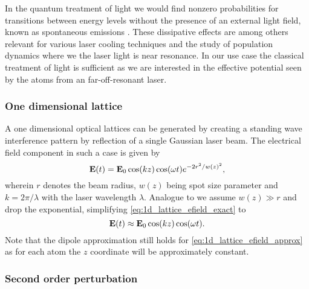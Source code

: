 In the quantum treatment of light we would find nonzero probabilities for
transitions between energy levels without the presence of an external light
field, known as spontaneous emissions \cite{Gerry2004}. These dissipative
effects are among others relevant for various laser cooling techniques and
the study of population dynamics where we the laser light is near resonance.
In our use case the classical treatment of light is sufficient as we are
interested in the effective potential seen by the atoms from an
far-off-resonant laser.

\subsubsection{One dimensional lattice}

A one dimensional optical lattices can be generated by creating a standing
wave interference pattern by reflection of a single Gaussian laser beam. The
electrical field component in such a case is given by
\begin{equation}
  \vb{E}(t)
  =\vb{E}_0\cos(kz)\cos(\omega t)e^{-2r^2/w(z)^2}
  \label{eq:1d_lattice_efield_exact},
\end{equation}
wherein $r$ denotes the beam radius, $w(z)$ being spot size parameter and
$k=2\pi/\lambda$ with the laser wavelength $\lambda$. Analogue to
\cite[p.127]{Rom2009} we assume $w(z)\gg r$ and drop the exponential,
simplifying \cref{eq:1d_lattice_efield_exact} to
\begin{equation}
  \vb{E}(t)
  \approx\vb{E}_0\cos(kz)\cos(\omega t)
  \label{eq:1d_lattice_efield_approx}.
\end{equation}
Note that the dipole approximation still holds for
\cref{eq:1d_lattice_efield_approx} as for each atom the $z$ coordinate
will be approximately constant.

\subsubsection{Second order perturbation}

